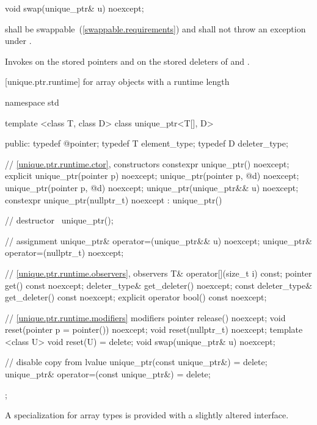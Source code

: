 \begin{itemdecl}
void swap(unique_ptr& u) noexcept;
\end{itemdecl}

\begin{itemdescr}
\pnum
\requires {} shall be
swappable~(\ref{swappable.requirements}) and shall
not throw an exception
under .

\pnum
\effects Invokes  on the stored pointers and on the stored
deleters of  and .
\end{itemdescr}

[unique.ptr.runtime]{ for array objects with a runtime length}

\begin{codeblock}
namespace std {
  template <class T, class D> class unique_ptr<T[], D> {
  public:
    typedef @\seebelow@ pointer;
    typedef T element_type;
    typedef D deleter_type;

    // \ref{unique.ptr.runtime.ctor}, constructors
    constexpr unique_ptr() noexcept;
    explicit unique_ptr(pointer p) noexcept;
    unique_ptr(pointer p, @\seebelow@ d) noexcept;
    unique_ptr(pointer p, @\seebelow@ d) noexcept;
    unique_ptr(unique_ptr&& u) noexcept;
    constexpr unique_ptr(nullptr_t) noexcept : unique_ptr() { }

    // destructor
    ~unique_ptr();

    // assignment
    unique_ptr& operator=(unique_ptr&& u) noexcept;
    unique_ptr& operator=(nullptr_t) noexcept;

    // \ref{unique.ptr.runtime.observers}, observers
    T& operator[](size_t i) const;
    pointer get() const noexcept;
    deleter_type& get_deleter() noexcept;
    const deleter_type& get_deleter() const noexcept;
    explicit operator bool() const noexcept;

    // \ref{unique.ptr.runtime.modifiers} modifiers
    pointer release() noexcept;
    void reset(pointer p = pointer()) noexcept;
    void reset(nullptr_t) noexcept;
    template <class U> void reset(U) = delete;
    void swap(unique_ptr& u) noexcept;

    // disable copy from lvalue
    unique_ptr(const unique_ptr&) = delete;
    unique_ptr& operator=(const unique_ptr&) = delete;
  };
}
\end{codeblock}

\pnum
A specialization for array types is provided with a slightly altered
interface.

